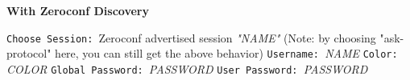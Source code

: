 {\bf With Zeroconf Discovery}

\hfil\break
{\tt Choose Session: }Zeroconf advertised session {\it
"NAME"}\hfil\break
{\notefont (Note: by choosing "ask-protocol" here, you can still get the
above behavior)}\hfil\break
{\tt Username: }{\it NAME} \hfil\break
{\tt Color: }{\it COLOR} \hfil\break
{\tt Global Password: }{\it PASSWORD} \hfil\break
{\tt User Password: }{\it PASSWORD} \hfil

\copyrightnotice

\bye


